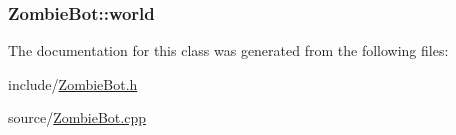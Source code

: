 \subsubsection[{\texorpdfstring{world}{world}}]{ Zombie\+Bot\+::world}\hypertarget{class_zombie_bot_ae4c9fe36c717e85cc6f0b71ea9c3a4f8}{}\label{class_zombie_bot_ae4c9fe36c717e85cc6f0b71ea9c3a4f8}


The documentation for this class was generated from the following files\+:\begin{DoxyCompactItemize}
\item 
include/\hyperlink{_zombie_bot_8h}{Zombie\+Bot.\+h}\item 
source/\hyperlink{_zombie_bot_8cpp}{Zombie\+Bot.\+cpp}\end{DoxyCompactItemize}
